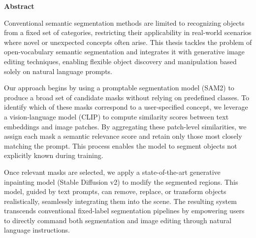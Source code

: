 \vspace{2.5cm}

{\Large \bfseries Abstract}

\vspace{1.5cm}

Conventional semantic segmentation methods are limited to recognizing objects from a fixed set of categories, restricting their applicability in real-world scenarios where novel or unexpected concepts often arise. This thesis tackles the problem of open-vocabulary semantic segmentation and integrates it with generative image editing techniques, enabling flexible object discovery and manipulation based solely on natural language prompts.

Our approach begins by using a promptable segmentation model (SAM2) to produce a broad set of candidate masks without relying on predefined classes. To identify which of these masks correspond to a user-specified concept, we leverage a vision-language model (CLIP) to compute similarity scores between text embeddings and image patches. By aggregating these patch-level similarities, we assign each mask a semantic relevance score and retain only those most closely matching the prompt. This process enables the model to segment objects not explicitly known during training.

Once relevant masks are selected, we apply a state-of-the-art generative inpainting model (Stable Diffusion v2) to modify the segmented regions. This model, guided by text prompts, can remove, replace, or transform objects realistically, seamlessly integrating them into the scene. The resulting system transcends conventional fixed-label segmentation pipelines by empowering users to directly command both segmentation and image editing through natural language instructions.


